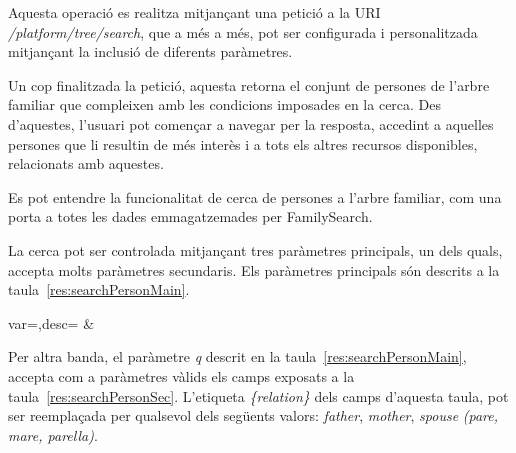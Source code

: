         Aquesta operació es realitza mitjançant una petició a la URI \emph{/platform/tree/\-search}, que a més a més, pot ser configurada i personalitzada mitjançant la inclusió de di\-fe\-rents paràmetres.

        Un cop finalitzada la petició, aquesta retorna el conjunt de persones de l'arbre familiar que compleixen amb les condicions imposades en la cerca. Des d'aquestes, l'usuari pot començar a navegar per la resposta, accedint a aquelles persones que li resultin de més interès i a tots els altres recursos disponibles, relacionats amb aquestes.

        Es pot entendre la funcionalitat de cerca de persones a l'arbre familiar, com una porta a totes les dades emmagatzemades per FamilySearch.

        La cerca pot ser controlada mitjançant tres paràmetres principals, un dels quals, accepta molts paràmetres secundaris. Els paràmetres principals són descrits a la taula~\ref{res:searchPersonMain}.

        \begin{center}
                 {var=\var,desc=\desc}
                 {\var&\desc}
         \end{center}

         Per altra banda, el paràmetre \emph{q} descrit en la taula~\ref{res:searchPersonMain}, accepta com a paràmetres vàlids els camps exposats a la taula~\ref{res:searchPersonSec}. L'etiqueta \emph{\{relation\}} dels camps d'aquesta taula, pot ser reemplaçada per qualsevol dels següents valors: \emph{father}, \emph{mother}, \emph{spouse} \emph{(pare, mare, parella)}.

